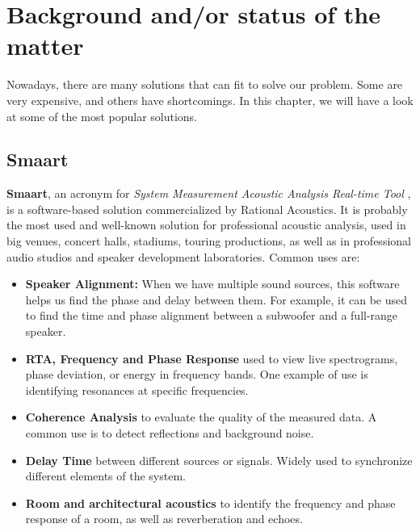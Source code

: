 \chapter{Background and/or status of the matter}

Nowadays, there are many solutions that can fit to solve our problem. Some are very expensive, and others have shortcomings. In this chapter, we will have a look at some of the most popular solutions.

\section{Smaart}

\textbf{Smaart}, an acronym for \textit{System Measurement Acoustic Analysis Real-time Tool} \cite{SMAART}, is a software-based solution commercialized by Rational Acoustics. It is probably the most used and well-known solution for professional acoustic analysis, used in big venues, concert halls, stadiums, touring productions, as well as in professional audio studios and speaker development laboratories.  Common uses are:

\begin{itemize}
	\item \textbf{Speaker Alignment:} When we have multiple sound sources, this software helps us find the phase and delay between them. For example, it can be used to find the time and phase alignment between a subwoofer and a full-range speaker.
	
	\item \textbf{RTA, Frequency and Phase Response} used to view live spectrograms, phase deviation, or energy in frequency bands. One example of use is identifying resonances at specific frequencies.

	\item \textbf{Coherence Analysis} to evaluate the quality of the measured data. A common use is to detect reflections and background noise.
	
	\item \textbf{Delay Time} between different sources or signals. Widely used to synchronize different elements of the system.
	
	\item \textbf{Room and architectural acoustics} to identify the frequency and phase response of a room, as well as reverberation and echoes.
\end{itemize}
	
